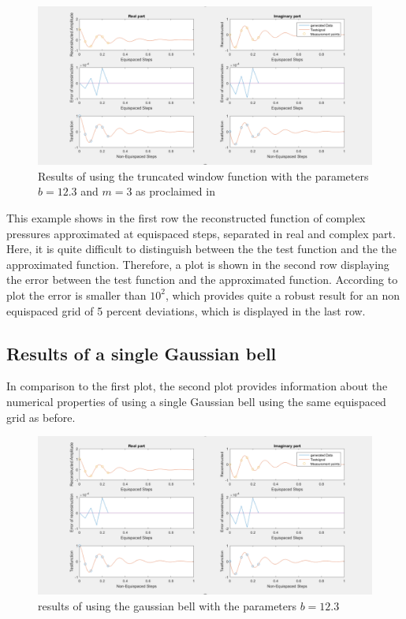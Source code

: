 \documentclass[11pt]{report} %
\begin{document}
\begin{figure}[H]
\centering
\includegraphics[scale=0.8]{./Figures/plot_trunc}
\caption{Results of using the truncated window function with the parameters $b=12.3$ and $m=3$ as proclaimed in }
\end{figure}

This example shows in the first row the reconstructed function of complex pressures approximated at equispaced steps, separated in real and complex part. 
Here, it is quite difficult to distinguish between the the test function and the the approximated function. 
Therefore, a plot is shown in the second row displaying the error between the test function and the approximated function. 
According to plot the error is smaller than $10^2$, which provides quite a robust result for an non equispaced grid of 5 percent deviations, which is displayed in the last row.


\subsection{Results of a single Gaussian bell}
In comparison to the first plot, the second plot provides information about the numerical properties of using a single Gaussian bell using the same equispaced grid as before.

\begin{figure}[H]
\centering
\includegraphics[scale=0.8]{./Figures/plot_trunc}
\caption{results of using the gaussian bell with the parameters $b=12.3$}
\end{figure}
\end{document}
